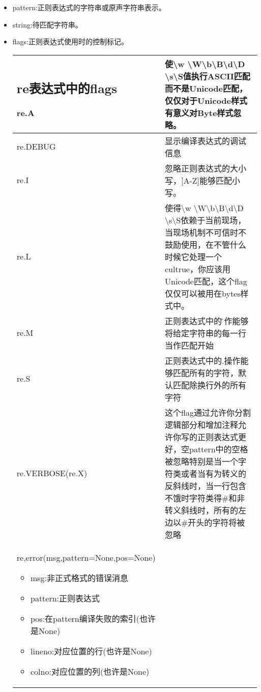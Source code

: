\begin{itemize}
\item pattern:正则表达式的字符串或原声字符串表示。
\item string:待匹配字符串。
\item flags:正则表达式使用时的控制标记。\newline
\begin{tabular}{|p{4cm}|p{10cm}|}
\hline
\subsection{re表达式中的flags}
re.A&使\textbackslash w \textbackslash W\textbackslash b\textbackslash B\textbackslash d\textbackslash D
\textbackslash s\textbackslash S值执行ASCII匹配而不是Unicode匹配，仅仅对于Unicode样式有意义对Byte样式忽略。\\
\hline
re.DEBUG&显示编译表达式的调试信息\\
\hline
re.I &忽略正则表达式的大小写，[A-Z]能够匹配小写。\\
\hline
re.L &使得\textbackslash w \textbackslash W\textbackslash b\textbackslash B\textbackslash d\textbackslash D
\textbackslash s\textbackslash S依赖于当前现场，当现场机制不可信时不鼓励使用，在不管什么时候它处理一个cultrue，你应该用Unicode匹配，这个flag仅仅可以被用在bytes样式中。\\
\hline
re.M &正则表达式中的\^操作能够将给定字符串的每一行当作匹配开始\\
\hline
re.S &正则表达式中的.操作能够匹配所有的字符，默认匹配除换行外的所有字符\\
re.VERBOSE(re.X)&这个flag通过允许你分割逻辑部分和增加注释允许你写的正则表达式更好，空pattern中的空格被忽略特别是当一个字符类或者当有为转义的反斜线时，当一行包含不饿时字符类得\#和非转义斜线时，所有的左边以\#开头的字符将被忽略\\
\hline
\hline
re,error(msg,pattern=None,pos=None)\newline
\begin{itemize}
\item msg:非正式格式的错误消息
\item pattern:正则表达式
\item pos:在pattern编译失败的索引(也许是None)
\item lineno:对应位置的行(也许是None)
\item colno:对应位置的列(也许是None)
\end{itemize}
\end{tabular}
\end{itemize}
